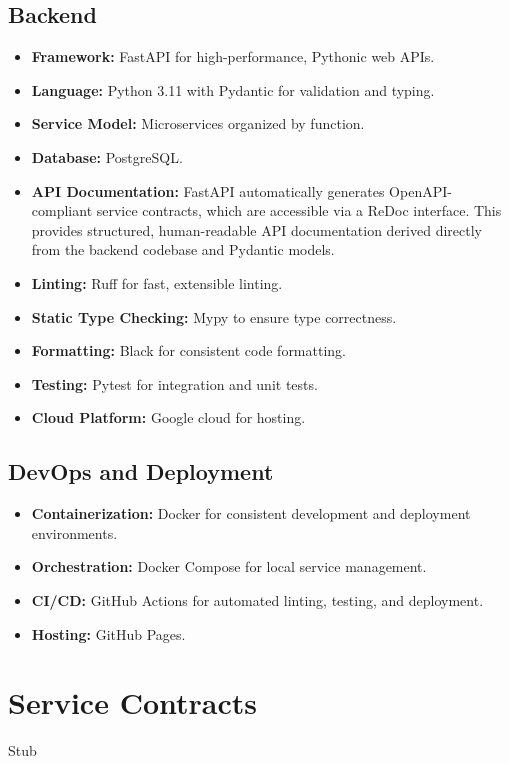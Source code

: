 \documentclass[12pt]{article}
\begin{document}
\subsection{Backend}
\begin{itemize}
  \item \textbf{Framework:} FastAPI for high-performance, Pythonic web APIs.
  \item \textbf{Language:} Python 3.11 with Pydantic for validation and typing.
  \item \textbf{Service Model:} Microservices organized by function.
  \item \textbf{Database:} PostgreSQL.
  \item \textbf{API Documentation:} FastAPI automatically generates OpenAPI-compliant service contracts, which are accessible via a ReDoc interface. This provides structured, human-readable API documentation derived directly from the backend codebase and Pydantic models.
  \item \textbf{Linting:} Ruff for fast, extensible linting.
  \item \textbf{Static Type Checking:} Mypy to ensure type correctness.
  \item \textbf{Formatting:} Black for consistent code formatting.
  \item \textbf{Testing:} Pytest for integration and unit tests.
  \item \textbf{Cloud Platform:} Google cloud for hosting.
\end{itemize}

\subsection{DevOps and Deployment}
\begin{itemize}
  \item \textbf{Containerization:} Docker for consistent development and deployment environments.
  \item \textbf{Orchestration:} Docker Compose for local service management.
  \item \textbf{CI/CD:} GitHub Actions for automated linting, testing, and deployment.
  \item \textbf{Hosting:} GitHub Pages.
\end{itemize}

\section{Service Contracts}
\begin{itemize}
Stub
\end{itemize}
\end{document}
